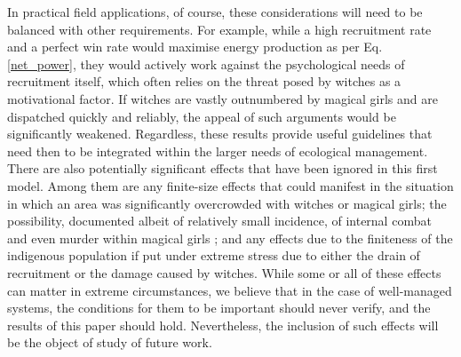 \documentclass[]{article}
\begin{document}
In practical field applications, of course, these considerations will need to be balanced with other requirements. For example, while a high recruitment rate and a perfect win rate would maximise energy production as per Eq. \ref{net_power}, they would actively work against the psychological needs of recruitment itself, which often relies on the threat posed by witches as a motivational factor. If witches are vastly outnumbered by magical girls and are dispatched quickly and reliably, the appeal of such arguments would be significantly weakened. Regardless, these results provide useful guidelines that need then to be integrated within the larger needs of ecological management.\newline
There are also potentially significant effects that have been ignored in this first model. Among them are any finite-size effects that could manifest in the situation in which an area was significantly overcrowded with witches or magical girls; the possibility, documented albeit of relatively small incidence, of internal combat and even murder within magical girls \cite{kyubey3}; and any effects due to the finiteness of the indigenous population if put under extreme stress due to either the drain of recruitment or the damage caused by witches. While some or all of these effects can matter in extreme circumstances, we believe that in the case of well-managed systems, the conditions for them to be important should never verify, and the results of this paper should hold. Nevertheless, the inclusion of such effects will be the object of study of future work.




\end{document}

